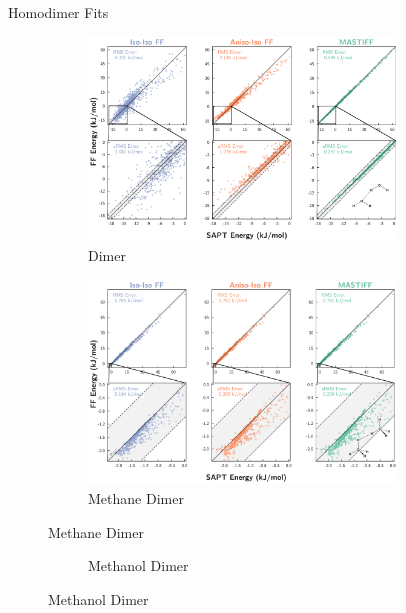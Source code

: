 \begin{section}{Homodimer Fits}
\begin{figure}
\begin{subfigure}{\textwidth}
    \end{subfigure}
    \end{figure}
    \begin{figure}
    \ContinuedFloat
    \begin{subfigure}{\textwidth}
        \caption{\ho Dimer}
        \includegraphics[width=0.9\textwidth]{anisotropic/si/homodimer_figures/h2o_h2o_comparison.pdf}
    \end{subfigure}
    \begin{subfigure}{\textwidth}
        \caption{Methane Dimer}
        \includegraphics[width=0.9\textwidth]{anisotropic/si/homodimer_figures/methane_methane_comparison.pdf}
    \end{subfigure}
    \end{figure}
    \begin{figure}
    \ContinuedFloat
    \begin{subfigure}{\textwidth}
        \caption{Methanol Dimer}

\end{subfigure}
\end{figure}
\end{section}
